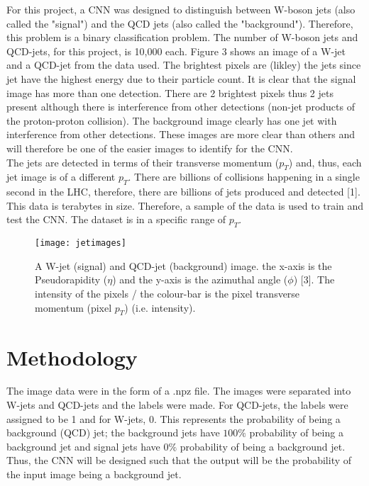 \documentclass[11pt, a4page]{article}
\begin{document}
For this project, a CNN was designed to distinguish between W-boson jets (also called the "signal") and the QCD jets (also called the "background"). Therefore, this problem is a binary classification problem. The number of W-boson jets and QCD-jets, for this project, is 10,000 each. Figure 3 shows an image of a W-jet and a QCD-jet from the data used. The brightest pixels are (likley) the jets since jet have the highest energy due to their particle count. It is clear that the signal image has more than one detection. There are 2 brightest pixels thus 2 jets present although there is interference from other detections (non-jet products of the proton-proton collision). The background image clearly has one jet with interference from other detections. These images are more clear than others and will therefore be one of the easier images to identify for the CNN.\\

The jets are detected in terms of their transverse momentum ($p_T$) and, thus, each jet image is of a different $p_T$. There are billions of collisions happening in a single second in the LHC, therefore, there are billions of jets produced and detected [1]. This data is terabytes in size. Therefore, a sample of the data is used to train and test the CNN. The dataset is in a specific range of $p_T$.\\
\begin{figure}[!ht]
    \centering
    \texttt{[image: jetimages]}
    \caption{A W-jet (signal) and QCD-jet (background) image. the x-axis is the Pseudorapidity ($\eta$) and the y-axis is the azimuthal angle ($\phi$) [3]. The intensity of the pixels / the colour-bar is the pixel transverse momentum (pixel $p_T$) (i.e. intensity). }
    \label{nothing}
\end{figure}










\pagebreak

\section{Methodology}

The image data were in the form of a .npz file. The images were separated into W-jets and QCD-jets and the labels were made. For QCD-jets, the labels were assigned to be 1 and for W-jets, 0. This represents the probability of being a background (QCD) jet; the background jets have $100\%$ probability of being a background jet and signal jets have $0\%$ probability of being a background jet. Thus, the CNN will be designed such that the output will be the probability of the input image being a background jet.\\
\end{document}
